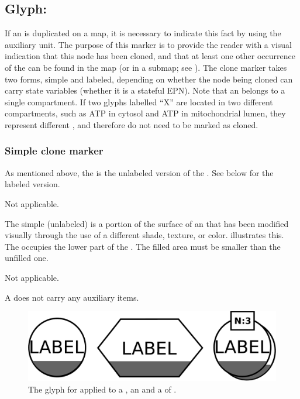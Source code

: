 
\subsection{Glyph: }
\label{sec:cloneMarker}

If an  is duplicated on a map, it is necessary to indicate this fact by using the  auxiliary unit.  The purpose of this marker is to provide the reader with a visual indication that this node has been cloned, and that at least one other occurrence of the  can be found in the map (or in a submap; see ).  The clone marker takes two forms, simple and labeled, depending on whether the node being cloned can carry state variables (\ie whether it is a stateful EPN). Note that an  belongs to a single compartment. If two glyphs labelled ``X'' are located in two different compartments, such as ATP in cytosol and ATP in mitochondrial lumen, they represent different , and therefore do not need to be marked as cloned.


\subsubsection{Simple clone marker}

As mentioned above, the  is the unlabeled version of the .  See below for the labeled version.


\begin{glyphDescription}

\glyphSboTerm Not applicable.

\glyphContainer The simple (unlabeled)  is a portion of the surface of an  that has been modified visually through the use of a different shade, texture, or color.   illustrates this.  The  occupies the lower part of the . The filled area must be smaller than the unfilled one.

\glyphLabel Not applicable.

\glyphAux A  does not carry any auxiliary items.

\end{glyphDescription}

\begin{figure}[H]
  \centering
  \includegraphics[scale = 0.3]{images/simpleCloneMarker}
  \caption{The \PD glyph for  applied to a , an  and a  of .}
  \label{fig:simpleCloneMarker}
\end{figure}


